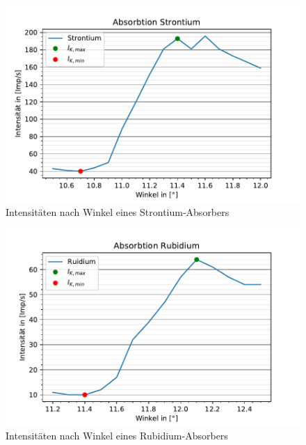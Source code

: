   \begin{figure}
    \centering
    \includegraphics{AbsorbtionsspektrumStrontium.pdf}
    \caption{Intensitäten nach Winkel eines Strontium-Absorbers}
    \label{fig:EmspektrumVI}
  \end{figure}

  \begin{figure}
    \centering
    \includegraphics{AbsorbtionsspektrumRubidium.pdf}
    \caption{Intensitäten nach Winkel eines Rubidium-Absorbers}
    \label{fig:EmspektrumVII}
  \end{figure}

